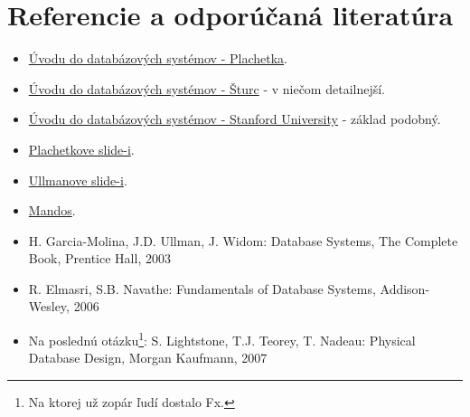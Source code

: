 \documentclass[10pt,a4paper]{article}
\begin{document}
\section*{Referencie a odporúčaná literatúra}
\begin{itemize}                                
\item \href{http://www.dcs.fmph.uniba.sk/~plachetk/TEACHING/DB2011/index.html}{Úvodu do databázových systémov - Plachetka}.        
\item \href{http://www.dcs.fmph.uniba.sk/~sturc/databazy/uvod/}{Úvodu do databázových systémov - Šturc} - v niečom detailnejší.        
\item \href{http://infolab.stanford.edu/~widom/cs145/}{Úvodu do databázových systémov - Stanford University} - základ podobný.


\item \href{http://csip.sk/uploads/plachetka\_uvod\_do\_databaz\_2011.pdf}{Plachetkove slide-i}.
\item \href{http://csip.sk/uploads/ullman.pdf}{Ullmanove slide-i}.
\item \href{http://fmfi-uk.hq.sk/Informatika/Uvod\%20Do\%20Databazovych\%20Systemov/prednasky/}{Mandos}.
\item H. Garcia-Molina, J.D. Ullman, J. Widom: Database Systems, The Complete Book, Prentice Hall, 2003
\item R. Elmasri, S.B. Navathe: Fundamentals of Database Systems, Addison-Wesley, 2006
\item Na poslednú otázku\footnote{
Na ktorej už zopár ľudí dostalo Fx.
}: S. Lightstone, T.J. Teorey, T. Nadeau: Physical Database Design, Morgan Kaufmann, 2007
\end{itemize}
\end{document}
